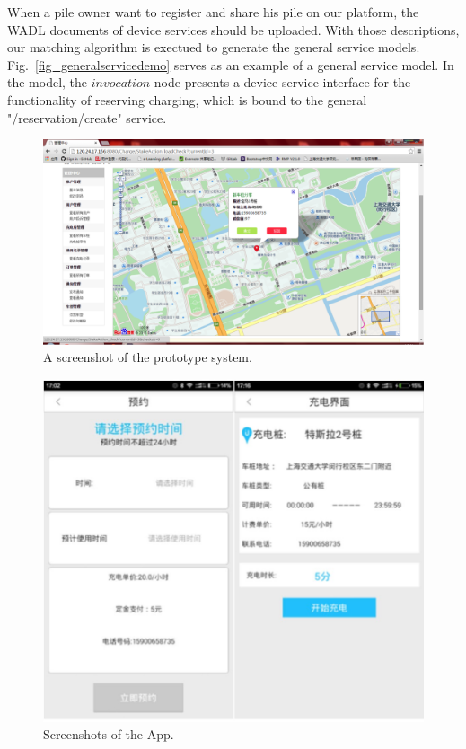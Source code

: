 When a pile owner want to register and share his pile on our platform, the WADL documents of device services should be uploaded. With those descriptions, our matching algorithm is exectued to generate the general service models. Fig.~\ref{fig_generalservicedemo} serves as an example of a general service model.
In the model, the $invocation$ node presents a device service interface for the functionality of reserving charging, which is bound to the general "/reservation/create" service. 

\begin{figure}[!b]
\centering
\includegraphics[width=1.0\linewidth]{./graph/prototype1}
\caption{A screenshot of the prototype system.}
\label{fig_prototype1}
\end{figure}

\begin{figure}[!t]
\centering
\includegraphics[width=1.0\linewidth]{./graph/app}
\caption{Screenshots of the App.}
\label{fig_app}
\end{figure}

